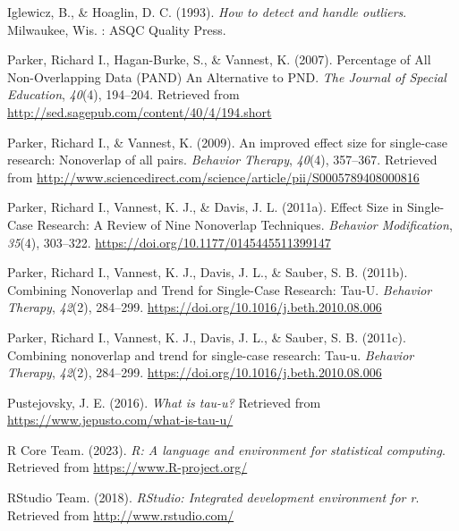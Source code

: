 \documentclass[
  letterpaper,
  DIV=11,
  numbers=noendperiod]{scrreprt}
\newlength{\cslhangindent}
\newlength{\cslentryspacingunit} %
\newenvironment{CSLReferences}[2] %
 {%
  \setlength{\parindent}{0pt}
  \ifodd #1
  \let\oldpar\par
  \def\par{\hangindent=\cslhangindent\oldpar}
  \fi
  \setlength{\parskip}{#2\cslentryspacingunit}
 }%
 {}
\begin{document}
\begin{CSLReferences}{1}{0}
\leavevmode{}%
Iglewicz, B., \& Hoaglin, D. C. (1993). \emph{How to detect and handle
outliers}. Milwaukee, Wis. : ASQC Quality Press.

\leavevmode{}%
Parker, Richard I., Hagan-Burke, S., \& Vannest, K. (2007). Percentage
of {All} {Non}-{Overlapping} {Data} ({PAND}) {An} {Alternative} to
{PND}. \emph{The Journal of Special Education}, \emph{40}(4), 194--204.
Retrieved from \url{http://sed.sagepub.com/content/40/4/194.short}

\leavevmode{}%
Parker, Richard I., \& Vannest, K. (2009). An improved effect size for
single-case research: {Nonoverlap} of all pairs. \emph{Behavior
Therapy}, \emph{40}(4), 357--367. Retrieved from
\url{http://www.sciencedirect.com/science/article/pii/S0005789408000816}

\leavevmode{}%
Parker, Richard I., Vannest, K. J., \& Davis, J. L. (2011a). Effect
{Size} in {Single}-{Case} {Research}: {A} {Review} of {Nine}
{Nonoverlap} {Techniques}. \emph{Behavior Modification}, \emph{35}(4),
303--322. \url{https://doi.org/10.1177/0145445511399147}

\leavevmode{}%
Parker, Richard I., Vannest, K. J., Davis, J. L., \& Sauber, S. B.
(2011b). Combining {Nonoverlap} and {Trend} for {Single}-{Case}
{Research}: {Tau}-{U}. \emph{Behavior Therapy}, \emph{42}(2), 284--299.
\url{https://doi.org/10.1016/j.beth.2010.08.006}

\leavevmode{}%
Parker, Richard I., Vannest, K. J., Davis, J. L., \& Sauber, S. B.
(2011c). Combining nonoverlap and trend for single-case research: Tau-u.
\emph{Behavior Therapy}, \emph{42}(2), 284--299.
\url{https://doi.org/10.1016/j.beth.2010.08.006}

\leavevmode{}%
Pustejovsky, J. E. (2016). \emph{What is tau-u?} Retrieved from
\url{https://www.jepusto.com/what-is-tau-u/}

\leavevmode{}%
R Core Team. (2023). \emph{R: A language and environment for statistical
computing}. Retrieved from \url{https://www.R-project.org/}

\leavevmode{}%
RStudio Team. (2018). \emph{RStudio: Integrated development environment
for r}. Retrieved from \url{http://www.rstudio.com/}


\end{CSLReferences}
\end{document}
